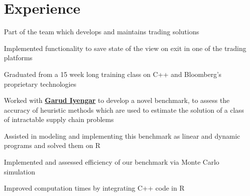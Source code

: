 \documentclass[letterpaper]{deedy-resume} %
\begin{document}
\hfill
%
%
\begin{minipage}[t]{0.66\textwidth} %


\section{Experience}


\vspace{\topsep} %
\begin{tightitemize}
\item Part of the team which develops and maintains trading solutions
\item Implemented functionality to save state of the view on exit in one of the trading platforms
\item Graduated from a 15 week long training class on C++ and Bloomberg's proprietary technologies
\end{tightitemize}

\sectionspace %



\begin{tightitemize}
\item Worked with \textbf{\href{http://ieor.columbia.edu/garud-n-iyengar}{Garud Iyengar}} to develop a novel benchmark, to assess the accuracy of heuristic methods which are used to estimate the solution of a class of intractable supply chain problems
\item Assisted in modeling and implementing this benchmark as linear and dynamic programs and solved them on R
\item Implemented and assessed efficiency of our benchmark via Monte Carlo simulation
\item Improved computation times by integrating C++ code in R
\end{tightitemize}


\end{minipage}
\end{document}
